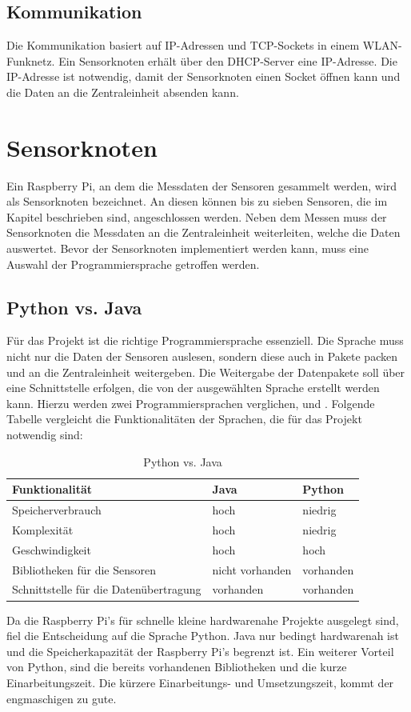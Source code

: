 \subsection{Kommunikation}
Die Kommunikation basiert auf IP-Adressen und TCP-Sockets in einem WLAN-Funknetz. Ein Sensorknoten erhält über den \ac{DHCP}-Server eine IP-Adresse. Die IP-Adresse ist notwendig, damit der Sensorknoten einen Socket öffnen kann und die Daten an die Zentraleinheit absenden kann. 

\section{Sensorknoten}
Ein Raspberry Pi, an dem die Messdaten der Sensoren gesammelt werden, wird als Sensorknoten bezeichnet. An diesen können bis zu sieben Sensoren, die im Kapitel  beschrieben sind, angeschlossen werden. Neben dem Messen muss der Sensorknoten die Messdaten an die Zentraleinheit weiterleiten, welche die Daten auswertet. Bevor der Sensorknoten implementiert werden kann, muss eine Auswahl der Programmiersprache getroffen werden.
\subsection{Python vs. Java}
Für das Projekt ist die richtige Programmiersprache essenziell. Die Sprache muss nicht nur die Daten der Sensoren auslesen, sondern diese auch in Pakete packen und an die Zentraleinheit weitergeben. Die Weitergabe der Datenpakete soll über eine Schnittstelle erfolgen, die von der ausgewählten Sprache erstellt werden kann. Hierzu werden zwei Programmiersprachen verglichen,  und . Folgende Tabelle vergleicht die Funktionalitäten der Sprachen, die für das Projekt notwendig sind:\hfill

\begin{table}[htb]
	\centering
	\caption{Python vs. Java}
	\label{tab:phytionvsjava}
	\begin{tabular}{l|l|l}
	\textbf{Funktionalität} & \textbf{Java} &\textbf{Python}   \\
	\hline
	 Speicherverbrauch & hoch & niedrig \\\hline
	Komplexität  & hoch & niedrig\\\hline
	Geschwindigkeit  & hoch & hoch \\\hline
	Bibliotheken für die Sensoren & nicht vorhanden & vorhanden \\\hline
	Schnittstelle für die Datenübertragung & vorhanden & vorhanden
	\end{tabular}
\end{table}
\noindent Da die Raspberry Pi's für schnelle kleine hardwarenahe Projekte ausgelegt sind, fiel die Entscheidung auf die Sprache Python. Java nur bedingt hardwarenah ist und die Speicherkapazität der Raspberry Pi's begrenzt ist. Ein weiterer Vorteil von Python, sind die bereits vorhandenen Bibliotheken und die kurze Einarbeitungszeit. Die kürzere Einarbeitungs- und Umsetzungszeit, kommt der engmaschigen  zu gute. %

